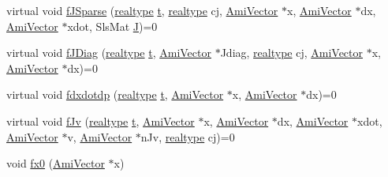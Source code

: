 \begin{DoxyCompactItemize}
\item 
virtual void \mbox{\hyperlink{classamici_1_1_model_a4b499d01a3e0504bcd8eda681b8da277}{f\+J\+Sparse}} (\mbox{\hyperlink{namespaceamici_a1bdce28051d6a53868f7ccbf5f2c14a3}{realtype}} \mbox{\hyperlink{classamici_1_1_model_a711281d57e9710226face29151cc4641}{t}}, \mbox{\hyperlink{namespaceamici_a1bdce28051d6a53868f7ccbf5f2c14a3}{realtype}} cj, \mbox{\hyperlink{classamici_1_1_ami_vector}{Ami\+Vector}} $\ast$x, \mbox{\hyperlink{classamici_1_1_ami_vector}{Ami\+Vector}} $\ast$dx, \mbox{\hyperlink{classamici_1_1_ami_vector}{Ami\+Vector}} $\ast$xdot, Sls\+Mat \mbox{\hyperlink{classamici_1_1_model_a71cc1d93543998249a172328e1a4dbcd}{J}})=0
\item 
virtual void \mbox{\hyperlink{classamici_1_1_model_a6cf54c0a48ef223795655bdd44a339b7}{f\+J\+Diag}} (\mbox{\hyperlink{namespaceamici_a1bdce28051d6a53868f7ccbf5f2c14a3}{realtype}} \mbox{\hyperlink{classamici_1_1_model_a711281d57e9710226face29151cc4641}{t}}, \mbox{\hyperlink{classamici_1_1_ami_vector}{Ami\+Vector}} $\ast$Jdiag, \mbox{\hyperlink{namespaceamici_a1bdce28051d6a53868f7ccbf5f2c14a3}{realtype}} cj, \mbox{\hyperlink{classamici_1_1_ami_vector}{Ami\+Vector}} $\ast$x, \mbox{\hyperlink{classamici_1_1_ami_vector}{Ami\+Vector}} $\ast$dx)=0
\item 
virtual void \mbox{\hyperlink{classamici_1_1_model_a7ce1e14d4137c249bc44e18345b562b8}{fdxdotdp}} (\mbox{\hyperlink{namespaceamici_a1bdce28051d6a53868f7ccbf5f2c14a3}{realtype}} \mbox{\hyperlink{classamici_1_1_model_a711281d57e9710226face29151cc4641}{t}}, \mbox{\hyperlink{classamici_1_1_ami_vector}{Ami\+Vector}} $\ast$x, \mbox{\hyperlink{classamici_1_1_ami_vector}{Ami\+Vector}} $\ast$dx)=0
\item 
virtual void \mbox{\hyperlink{classamici_1_1_model_ae08b9d7a7d15898e4dd7c71ac057c6a5}{f\+Jv}} (\mbox{\hyperlink{namespaceamici_a1bdce28051d6a53868f7ccbf5f2c14a3}{realtype}} \mbox{\hyperlink{classamici_1_1_model_a711281d57e9710226face29151cc4641}{t}}, \mbox{\hyperlink{classamici_1_1_ami_vector}{Ami\+Vector}} $\ast$x, \mbox{\hyperlink{classamici_1_1_ami_vector}{Ami\+Vector}} $\ast$dx, \mbox{\hyperlink{classamici_1_1_ami_vector}{Ami\+Vector}} $\ast$xdot, \mbox{\hyperlink{classamici_1_1_ami_vector}{Ami\+Vector}} $\ast$v, \mbox{\hyperlink{classamici_1_1_ami_vector}{Ami\+Vector}} $\ast$n\+Jv, \mbox{\hyperlink{namespaceamici_a1bdce28051d6a53868f7ccbf5f2c14a3}{realtype}} cj)=0
\item 
void \mbox{\hyperlink{classamici_1_1_model_aa9a9e12a414d9ac91249b63d01ab7bca}{fx0}} (\mbox{\hyperlink{classamici_1_1_ami_vector}{Ami\+Vector}} $\ast$x)

\end{DoxyCompactItemize}
